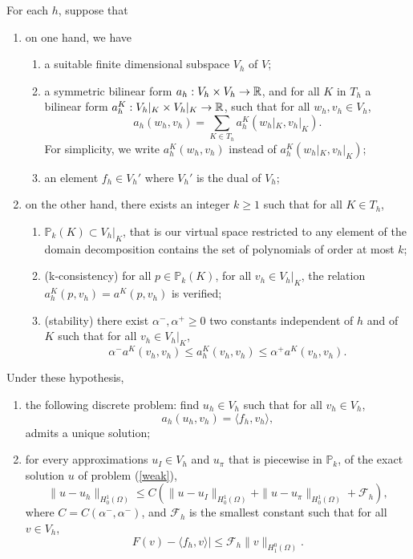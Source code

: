 \begin{theorem}
For each $h$, suppose that
\begin{enumerate}
\item on one hand, we have \begin{enumerate}
\item a suitable finite dimensional subspace $V_h$ of $V$;
\item a symmetric bilinear form $a_h : V_h\times V_h \rightarrow \mathbb{R}$, and for all $K$ in $T_h$ a bilinear form $a_h^K:V_h|_K \times V_h|_K \rightarrow \mathbb{R}$, such that for all $w_h,v_h\in V_h$, 
$$ a_h(w_h, v_h) = \sum_{K\in T_h} a_h^K(w_h|_K,v_h|_K).$$ For simplicity, we write $a_h^K(w_h,v_h)$ instead of $a_h^K(w_h|_K,v_h|_K)$;
\item an element $f_h \in V_h'$ where $V_h'$ is the dual of $V_h$;
\end{enumerate}
\item on the other hand, there exists an integer $k\geq 1$ such that for all $K \in T_h$,
\begin{enumerate}
\item $\mathbb{P}_k(K) \subset V_h|_K$, that is our virtual space restricted to any element of the domain decomposition contains the set of polynomials of order at most $k$;
\item(k-consistency) for all $p\in \mathbb{P}_k(K)$, for all $v_h\in V_h|_K$, the relation $a_h^K(p, v_h) = a^K(p, v_h)$ is verified;
\item (stability) there exist $\alpha^-, \alpha^+ \geq 0$ two constants independent of $h$ and of $K$ such that for all $v_h\in V_h|_K$,
$$ \alpha^-a^K(v_h,v_h)\leq a_h^K(v_h,v_h)\leq \alpha^+a^K(v_h,v_h).$$
\end{enumerate}
\end{enumerate}
Under these hypothesis, 
\begin{enumerate}
\item the following discrete problem: find $u_h\in V_h$ such that for all $v_h \in V_h$, \begin{equation}\label{discretepb}
a_h(u_h,v_h) = \langle f_h,v_h\rangle,
\end{equation} admits a unique solution;
\item for every approximations $u_I\in V_h$ and $u_\pi$ that is piecewise in $\mathbb{P}_k$, of the exact solution $u$ of problem (\ref{weak}), $$\|u-u_h\|_{H_0^1(\Omega)} \leq C\left(\|u-u_I\|_{H_0^1(\Omega)} + \|u-u_\pi\|_{H_0^1(\Omega)} + \mathcal{F}_h\right),$$
where $C=C(\alpha^-,\alpha^-)$, and $\mathcal{F}_h$ is the smallest constant such that for all $v\in V_h$, 
\begin{equation}\label{calFh}
F(v)-\langle f_h,v\rangle| \leq \mathcal{F}_h\|v\|_{H^0_1(\Omega)}.
\end{equation}
\end{enumerate}
\end{theorem}
